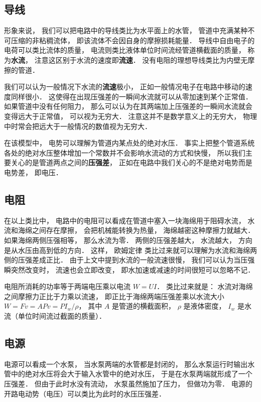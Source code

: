 
\subsection{导线}
形象来说， 我们可以把电路中的导线类比为水平面上的水管， 管道中充满某种不可压缩的非粘稠流体， 即该流体不会因自身的摩擦损耗能量． 导线中自由电子的电荷可以类比流体的质量， 电流则类比液体单位时间流经管道横截面的质量， 称为\textbf{水流}， 注意这区别于水流的速度即\textbf{流速}． 没有电阻的理想导线类比为内壁无摩擦的管道．

我们可以认为一般情况下水流的\textbf{流速}极小， 正如一般情况电子在电路中移动的速度同样很小． 这使得在出现压强差的一瞬间水流就可以从零加速到某个正常值． 如果管道中没有任何阻力， 那么可以认为在其两端加上压强差的一瞬间水流就会变得远大于正常值， 可以视为无穷大． 注意这并不是数学意义上的无穷大， 物理中时常会把远大于一般情况的数值视为无穷大．

在该模型中， 电势可以理解为管道内某点处的绝对水压． 事实上把整个管道系统各处的绝对水压整体增加一个常数并不会影响水流动的方式和快慢， 所以我们主要关心的是管道两点之间的\textbf{压强差}， 正如在电路中我们关心的不是绝对电势而是电势差， 即电压．

\subsection{电阻}
在以上类比中， 电路中的电阻可以看成在管道中塞入一块海绵用于阻碍水流， 水流和海绵之间存在摩擦， 会把机械能转换为热量， 海绵越密这种摩擦力就越大． 如果海绵两侧压强相等， 那么水流为零． 两侧的压强差越大， 水流越大， 方向是从水压由高到低的方向． 这样， 欧姆定律 类比过来就可以理解为水流和海绵两侧的压强差成正比． 由于上文中提到水流的一般流速很慢， 我们可以认为当压强瞬突然改变时， 流速也会立即改变， 即水加速或减速的时间很短可以忽略不记．

电阻所消耗的功率等于两端电压乘以电流 $W = UI$． 类比过来就是： 水流对海绵之间摩擦力正比于力乘以流速， 即正比于海绵两端压强差乘以水流大小 $W = F v = APv = PI_w/\rho$， 其中 $A$ 是管道的横截面积， $\rho$ 是液体密度， $I_w$ 是水流（单位时间流过截面的质量）．

\subsection{电源}
电源可以看成一个水泵， 当水泵两端的水管都是封闭的， 那么水泵运行时输出水管中的绝对水压将会大于输入水管中的绝对水压， 于是在水泵两端就形成了一个压强差． 但由于此时水没有流动， 水泵虽然施加了压力， 但做功为零． 电源的开路电动势（电压）可以类比为此时的水压压强差．

